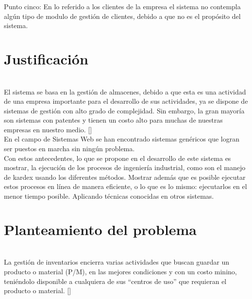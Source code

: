 Punto cinco: En  lo referido a los clientes de la empresa el sistema no contempla algún tipo de modulo de gestión de clientes, debido a que no es el propósito del sistema.\\

\section{Justificación}

\\
El sistema se basa en la gestión de almacenes, debido a que esta es una actividad de una empresa importante para el desarrollo de sus actividades, ya se dispone de sistemas de gestión con alto grado de complejidad. Sin embargo, la gran mayoría son sistemas con patentes y tienen un costo alto para muchas de nuestras empresas en nuestro medio. [\citep{UDL:2019:Online}]\\

En el campo de Sistemas Web se han encontrado sistemas genéricos que logran ser puestos en marcha sin ningún problema.\\

Con estos antecedentes, lo que se propone en el desarrollo de este sistema es mostrar, la ejecución de los procesos de ingeniería industrial, como son el manejo de kardex usando los diferentes métodos. Mostrar además que es posible ejecutar estos procesos en línea de manera eficiente, o lo que es lo mismo: ejecutarlos en el menor tiempo posible. Aplicando técnicas conocidas en otros sistemas.\\


\section{Planteamiento del problema}

\\
La gestión de inventarios encierra varias actividades que buscan guardar un producto o material (P/M), en las mejores condiciones y con un costo minino, teniéndolo disponible a cualquiera de sus “centros de uso” que requieran el producto o material. [\citep{PMA:2019:Online}]\\

